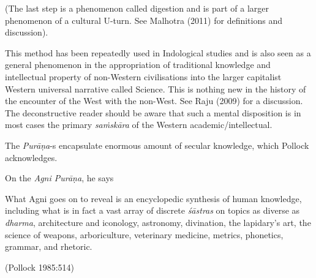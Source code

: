 (The last step is a phenomenon called digestion and is part of a larger phenomenon of a cultural U-turn. See Malhotra (2011) for definitions and discussion).

This method has been repeatedly used in Indological studies and is also seen as a general phenomenon in the appropriation of traditional knowledge and intellectual property of non-Western civilisations into the larger capitalist Western universal narrative called Science. This is nothing new in the history of the encounter of the West with the non-West. See Raju (2009) for a discussion. The deconstructive reader should be aware that such a mental disposition is in most cases the primary {\sl saṁskāra} of the Western academic/intellectual.

The {\sl Purāṇa}-s encapsulate enormous amount of secular knowledge, which Pollock acknowledges.

On the {\sl Agni Purāṇa}, he says
\begin{myquote}
What Agni goes on to reveal is an encyclopedic synthesis of human knowledge, including what is in fact a vast array of discrete {\sl śāstras} on topics as diverse as {\sl dharma}, architecture and iconology, astronomy, divination, the lapidary's art, the science of weapons, arboriculture, veterinary medicine, metrics, phonetics, grammar, and rhetoric.

\hfill (Pollock 1985:514)
\end{myquote}


